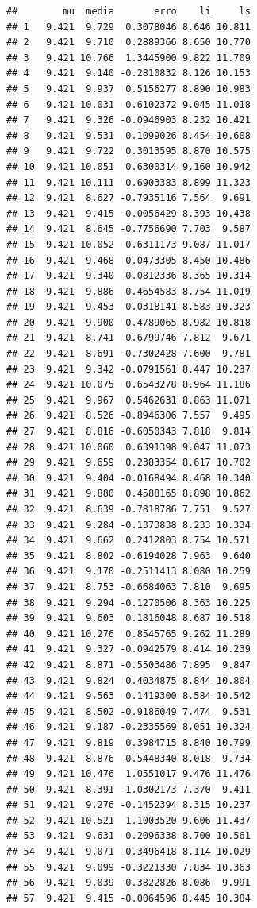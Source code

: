 \documentclass[
]{book}
\begin{document}
\begin{verbatim}
##        mu  media       erro    li     ls
## 1   9.421  9.729  0.3078046 8.646 10.811
## 2   9.421  9.710  0.2889366 8.650 10.770
## 3   9.421 10.766  1.3445900 9.822 11.709
## 4   9.421  9.140 -0.2810832 8.126 10.153
## 5   9.421  9.937  0.5156277 8.890 10.983
## 6   9.421 10.031  0.6102372 9.045 11.018
## 7   9.421  9.326 -0.0946903 8.232 10.421
## 8   9.421  9.531  0.1099026 8.454 10.608
## 9   9.421  9.722  0.3013595 8.870 10.575
## 10  9.421 10.051  0.6300314 9.160 10.942
## 11  9.421 10.111  0.6903383 8.899 11.323
## 12  9.421  8.627 -0.7935116 7.564  9.691
## 13  9.421  9.415 -0.0056429 8.393 10.438
## 14  9.421  8.645 -0.7756690 7.703  9.587
## 15  9.421 10.052  0.6311173 9.087 11.017
## 16  9.421  9.468  0.0473305 8.450 10.486
## 17  9.421  9.340 -0.0812336 8.365 10.314
## 18  9.421  9.886  0.4654583 8.754 11.019
## 19  9.421  9.453  0.0318141 8.583 10.323
## 20  9.421  9.900  0.4789065 8.982 10.818
## 21  9.421  8.741 -0.6799746 7.812  9.671
## 22  9.421  8.691 -0.7302428 7.600  9.781
## 23  9.421  9.342 -0.0791561 8.447 10.237
## 24  9.421 10.075  0.6543278 8.964 11.186
## 25  9.421  9.967  0.5462631 8.863 11.071
## 26  9.421  8.526 -0.8946306 7.557  9.495
## 27  9.421  8.816 -0.6050343 7.818  9.814
## 28  9.421 10.060  0.6391398 9.047 11.073
## 29  9.421  9.659  0.2383354 8.617 10.702
## 30  9.421  9.404 -0.0168494 8.468 10.340
## 31  9.421  9.880  0.4588165 8.898 10.862
## 32  9.421  8.639 -0.7818786 7.751  9.527
## 33  9.421  9.284 -0.1373838 8.233 10.334
## 34  9.421  9.662  0.2412803 8.754 10.571
## 35  9.421  8.802 -0.6194028 7.963  9.640
## 36  9.421  9.170 -0.2511413 8.080 10.259
## 37  9.421  8.753 -0.6684063 7.810  9.695
## 38  9.421  9.294 -0.1270506 8.363 10.225
## 39  9.421  9.603  0.1816048 8.687 10.518
## 40  9.421 10.276  0.8545765 9.262 11.289
## 41  9.421  9.327 -0.0942579 8.414 10.239
## 42  9.421  8.871 -0.5503486 7.895  9.847
## 43  9.421  9.824  0.4034875 8.844 10.804
## 44  9.421  9.563  0.1419300 8.584 10.542
## 45  9.421  8.502 -0.9186049 7.474  9.531
## 46  9.421  9.187 -0.2335569 8.051 10.324
## 47  9.421  9.819  0.3984715 8.840 10.799
## 48  9.421  8.876 -0.5448340 8.018  9.734
## 49  9.421 10.476  1.0551017 9.476 11.476
## 50  9.421  8.391 -1.0302173 7.370  9.411
## 51  9.421  9.276 -0.1452394 8.315 10.237
## 52  9.421 10.521  1.1003520 9.606 11.437
## 53  9.421  9.631  0.2096338 8.700 10.561
## 54  9.421  9.071 -0.3496418 8.114 10.029
## 55  9.421  9.099 -0.3221330 7.834 10.363
## 56  9.421  9.039 -0.3822826 8.086  9.991
## 57  9.421  9.415 -0.0064596 8.445 10.384

\end{verbatim}
\end{document}
